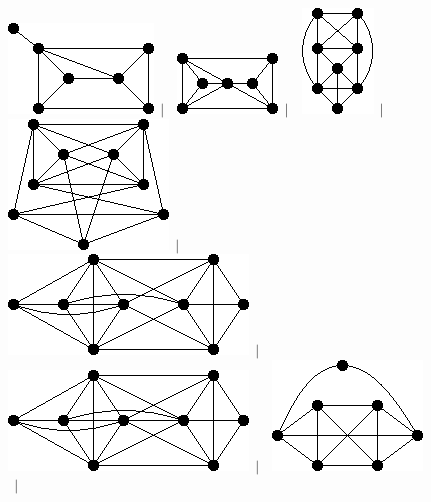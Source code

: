 \documentclass[11pt,paper=b5,footinclude,headinclude]{scrbook} %
\newtheorem{ex}{Vaja\hypertarget{sol:\theex}}[chapter]
\begin{document}
\begin{ex}
\begin{figure}
\includegraphics[scale=0.5]{smallGraphs/g_co-X199.png}$\,\mid\,$\
\includegraphics[scale=0.5]{smallGraphs/g_co-X20.png}$\,\mid\,$\
\includegraphics[scale=0.5]{smallGraphs/g_co-X205.png}$\,\mid\,$\
\includegraphics[scale=0.5]{smallGraphs/g_co-X209.png}$\,\mid\,$\
\includegraphics[scale=0.5]{smallGraphs/g_co-X23.png}$\,\mid\,$\
\includegraphics[scale=0.5]{smallGraphs/g_co-X24.png}$\,\mid\,$\
\includegraphics[scale=0.5]{smallGraphs/g_co-X27.png}$\,\mid\,$\

\end{figure}
\end{ex}
\end{document}
